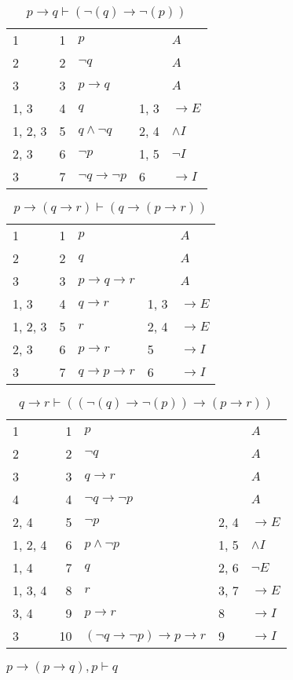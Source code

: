 \documentclass{article}
\begin{document}
\begin{table}[htbp]
\end{table}\begin{table}[htbp]\caption*{$p→q ⊢ (¬(q)→ ¬(p))$}\centering\begin{tabular}{lrlll}
{1} & 1 & $p$ & {} & $A$ \\
{2} & 2 & $¬q$ & {} & $A$ \\
{3} & 3 & $p→q$ & {} & $A$ \\
{1, 3} & 4 & $q$ & {1, 3} & $→E$ \\
{1, 2, 3} & 5 & $q∧ ¬q$ & {2, 4} & $∧I$ \\
{2, 3} & 6 & $¬p$ & {1, 5} & $¬I$ \\
{3} & 7 & $¬q→ ¬p$ & {6} & $→I$ \\
\end{tabular}
\end{table}\begin{table}[htbp]\caption*{$p→(q→r) ⊢ (q→(p→r))$}\centering\begin{tabular}{lrlll}
{1} & 1 & $p$ & {} & $A$ \\
{2} & 2 & $q$ & {} & $A$ \\
{3} & 3 & $p→q→r$ & {} & $A$ \\
{1, 3} & 4 & $q→r$ & {1, 3} & $→E$ \\
{1, 2, 3} & 5 & $r$ & {2, 4} & $→E$ \\
{2, 3} & 6 & $p→r$ & {5} & $→I$ \\
{3} & 7 & $q→p→r$ & {6} & $→I$ \\
\end{tabular}
\end{table}\begin{table}[htbp]\caption*{$q→r ⊢ ((¬(q)→ ¬(p))→ (p→r))$}\centering\begin{tabular}{lrlll}
{1} & 1 & $p$ & {} & $A$ \\
{2} & 2 & $¬q$ & {} & $A$ \\
{3} & 3 & $q→r$ & {} & $A$ \\
{4} & 4 & $¬q→ ¬p$ & {} & $A$ \\
{2, 4} & 5 & $¬p$ & {2, 4} & $→E$ \\
{1, 2, 4} & 6 & $p∧ ¬p$ & {1, 5} & $∧I$ \\
{1, 4} & 7 & $q$ & {2, 6} & $¬E$ \\
{1, 3, 4} & 8 & $r$ & {3, 7} & $→E$ \\
{3, 4} & 9 & $p→r$ & {8} & $→I$ \\
{3} & 10 & $(¬q→ ¬p)→p→r$ & {9} & $→I$ \\
\end{tabular}
\end{table}\begin{table}[htbp]\caption*{$p → (p → q),p ⊢ q$}\centering\begin{tabular}{lrlll}

\end{tabular}
\end{table}
\end{document}

